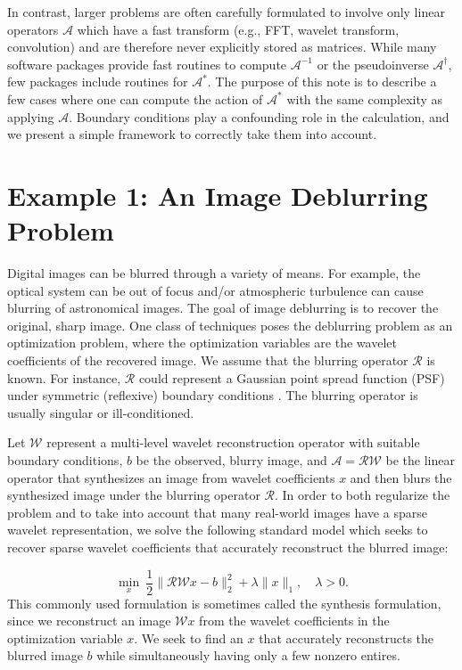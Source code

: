 \documentclass[journal]{IEEEtran}
\newcommand{\A}{\mathcal{A}}
\begin{document}
In contrast, larger problems are often carefully formulated to involve only linear operators $\A$ which have a fast transform (e.g., FFT, wavelet transform, convolution) and are therefore never explicitly stored as matrices.  While many software packages provide fast routines to compute $\A^{-1}$ or the pseudoinverse $\A^\dagger$, few packages include routines for $\A^*$.
The purpose of this note is to describe a few cases where one can compute the action of $\A^*$ with the same complexity as applying $\A$. Boundary conditions play a confounding role in the calculation, and we present a simple framework to correctly take them into account.


\section{Example 1: An Image Deblurring Problem}
Digital images can be blurred through a variety of means.  For example, the optical system can be out of focus and/or atmospheric turbulence can cause blurring of astronomical images.  The goal of image deblurring is to recover the original, sharp image. One class of techniques poses the deblurring problem  as an optimization problem, where the optimization variables are the wavelet coefficients of the recovered image.  We assume  that the blurring operator $\mathcal{R}$ is known. For instance, $\mathcal{R}$ could represent a Gaussian point spread function (PSF) under symmetric (reflexive) boundary conditions \cite{hansen_2006}. The blurring operator is usually singular or ill-conditioned.

Let $\mathcal{W}$ represent a multi-level wavelet reconstruction operator with suitable boundary conditions, $b$ be the observed, blurry image, and $\mathcal{A}=\mathcal{RW}$ be the linear operator that synthesizes an image from wavelet coefficients $x$ and then blurs the synthesized image under the blurring operator $\mathcal{R}$.  In order to both regularize the problem and to take into account that many real-world images have a sparse wavelet representation, we solve the following standard model which seeks to recover sparse wavelet coefficients that accurately reconstruct the blurred image:

\begin{equation}
\label{eq:syn_problem}
\min_x~ \dfrac{1}{2}\|\mathcal{RW}x-b\|_2^2 + \lambda \|x\|_1, \quad \lambda>0.
\end{equation}
This commonly used formulation \cite{beck_2009} is sometimes called the synthesis formulation, since we reconstruct an image $\mathcal{W}x$ from the wavelet coefficients in the optimization variable $x$.  We seek to find an $x$ that accurately reconstructs the blurred image $b$ while simultaneously having only a few nonzero entires.
\end{document}
